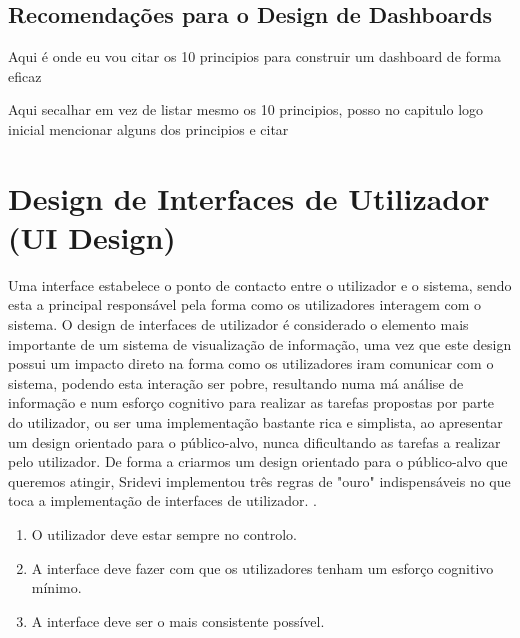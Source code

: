 \subsection{Recomendações para o Design de Dashboards} %
\label{sub:recomendacoes}

Aqui é onde eu vou citar os 10 principios para construir um dashboard de forma eficaz

Aqui secalhar em vez de listar mesmo os 10 principios, posso no capitulo logo inicial mencionar alguns dos principios e citar

\section{Design de Interfaces de Utilizador (UI Design)} %
\label{sec:ui_design}

Uma interface estabelece o ponto de contacto entre o utilizador e o sistema, sendo esta a principal responsável pela forma como os utilizadores interagem com o sistema. O design de interfaces de utilizador é considerado o elemento mais importante de um sistema de visualização de informação, uma vez que este design possui um impacto direto na forma como os utilizadores iram comunicar com o sistema, podendo esta interação ser pobre, resultando numa má análise de informação e num esforço cognitivo para realizar as tarefas propostas por parte do utilizador, ou ser uma implementação bastante rica e simplista, ao apresentar um design orientado para o público-alvo, nunca dificultando as tarefas a realizar pelo utilizador. De forma a criarmos um design orientado para o público-alvo que queremos atingir, Sridevi implementou três regras de "ouro" indispensáveis no que toca a implementação de interfaces de utilizador. \cite{sridevi2014user}.

\begin{enumerate}
  \item O utilizador deve estar sempre no controlo.
  \item A interface deve fazer com que os utilizadores tenham um esforço cognitivo mínimo.
  \item A interface deve ser o mais consistente possível.
\end{enumerate}

